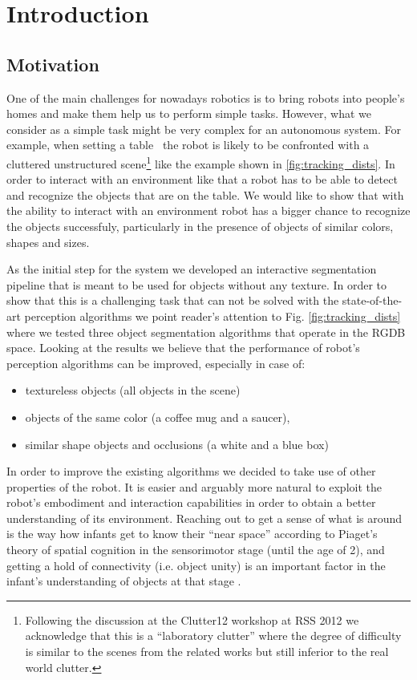\chapter{Introduction}
\label{chapter:Introduction}


 
\section{Motivation}
\label{sec:intro}
One of the main challenges for nowadays robotics is to bring robots into people's homes and make them help us to perform simple tasks. However, what we consider as a simple task might be very complex for an autonomous system. For example, when setting a table~\cite{iros10kcopman} the robot is likely to be
confronted with a cluttered unstructured scene\footnote{Following the discussion at the Clutter12
workshop at RSS 2012 we acknowledge that this is a ``laboratory clutter'' where the degree of difficulty
is similar to the scenes from the related works but still inferior to the real world clutter.} like the example shown
in \ref{fig:tracking_dists}. In order to interact with an environment like that a robot has to be able to detect and recognize the objects that are on the table. We would like to show that with the ability to interact with an environment robot has a bigger chance to recognize the objects successfuly, particularly in the presence of objects of similar colors, shapes and sizes. 


As the initial step for the system we developed an interactive segmentation pipeline that is meant to be used for objects without any texture. In order to show that this is a challenging task that can not be solved with the state-of-the-art perception algorithms we point reader's attention to Fig. \ref{fig:tracking_dists} where we tested three object segmentation algorithms that operate in the RGDB space. Looking at the results we believe that the performance of robot's perception algorithms can be improved, especially in case of: 

\begin{itemize} 
\item textureless objects (all objects in the scene)
\item objects of the same color (a coffee mug and a saucer), 
\item similar shape objects and occlusions (a white and a blue box) 
\end{itemize}

In order to improve the existing algorithms we decided to take use of other properties of the robot. It is easier and arguably more natural to exploit the robot's embodiment
and interaction capabilities in order to obtain a better understanding of its environment.
Reaching out to get a sense of what is around is the way how infants get to know their
``near space'' according to Piaget's theory of spatial cognition in the sensorimotor stage 
(until the age of 2), and getting a hold of connectivity (i.e. object unity) is an important
factor in the infant's understanding of objects at that stage \cite{infants}.


